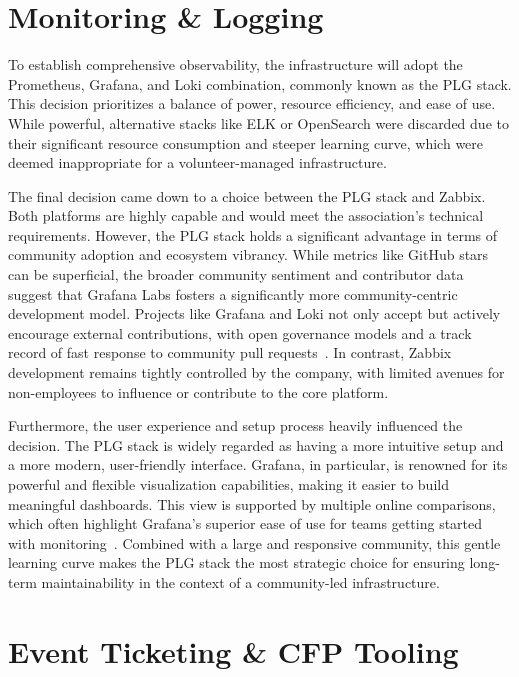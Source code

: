 \section{Monitoring \& Logging}

To establish comprehensive observability, the infrastructure will adopt the Prometheus, Grafana, and Loki combination, commonly known as the PLG stack. This decision prioritizes a balance of power, resource efficiency, and ease of use. While powerful, alternative stacks like ELK or OpenSearch were discarded due to their significant resource consumption and steeper learning curve, which were deemed inappropriate for a volunteer-managed infrastructure.

The final decision came down to a choice between the PLG stack and Zabbix. Both platforms are highly capable and would meet the association's technical requirements. However, the PLG stack holds a significant advantage in terms of community adoption and ecosystem vibrancy. While metrics like GitHub stars can be superficial, the broader community sentiment and contributor data suggest that Grafana Labs fosters a significantly more community-centric development model. Projects like Grafana and Loki not only accept but actively encourage external contributions, with open governance models and a track record of fast response to community pull requests~\cite{collab-grafana}. In contrast, Zabbix development remains tightly controlled by the company, with limited avenues for non-employees to influence or contribute to the core platform.

Furthermore, the user experience and setup process heavily influenced the decision. The PLG stack is widely regarded as having a more intuitive setup and a more modern, user-friendly interface. Grafana, in particular, is renowned for its powerful and flexible visualization capabilities, making it easier to build meaningful dashboards. This view is supported by multiple online comparisons, which often highlight Grafana's superior ease of use for teams getting started with monitoring~\cite{squadcast-zabbix-grafana}. Combined with a large and responsive community, this gentle learning curve makes the PLG stack the most strategic choice for ensuring long-term maintainability in the context of a community-led infrastructure.

\section{Event Ticketing \& CFP Tooling}

